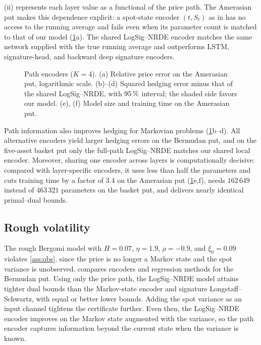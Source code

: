 (ii) represents each layer value as a functional of the price path. The Amerasian put makes this dependence explicit: a spot-state encoder $(t,S_t)$ as in \cite{huang2026} has no access to the running average and fails even when its parameter count is matched to that of our model (\cref{fig:encoders}a). The shared LogSig--NRDE encoder matches the same network supplied with the true running average and outperforms LSTM, signature-head, and backward deep signature \cite{bayraktar2024} encoders.

\begin{figure}[htbp]
\centering
\resizebox{\textwidth}{!}{}
\caption{Path encoders ($K=4$). (a) Relative price error on the Amerasian put, logarithmic scale. (b)--(d) Squared hedging error minus that of the shared LogSig--NRDE, with $95\,\%$ interval; the shaded side favors our model. (e), (f) Model size and training time on the Amerasian put.}
\label{fig:encoders}
\end{figure}

Path information also improves hedging for Markovian problems (\cref{fig:encoders}b--d). All alternative encoders yield larger hedging errors on the Bermudan put, and on the five-asset basket put only the full-path LogSig--NRDE matches our shared local encoder. Moreover, sharing one encoder across layers is computationally decisive: compared with layer-specific encoders, it uses less than half the parameters and cuts training time by a factor of $3.4$ on the Amerasian put (\cref{fig:encoders}e,f), needs $162\,649$ instead of $463\,321$ parameters on the basket put, and delivers nearly identical primal--dual bounds.


\subsection{Rough volatility}\label{sec:exp-rough}

The rough Bergomi model \cite{bayer2016} with $H=0.07$, $\eta=1.9$, $\rho=-0.9$, and $\xi_0=0.09$ violates \cref{ass:obs}, since the price is no longer a Markov state and the spot variance is unobserved.  compares encoders and regression methods for the Bermudan put. Using only the price path, the LogSig--NRDE model attains tighter dual bounds than the Markov-state encoder and signature Longstaff--Schwartz, with equal or better lower bounds. Adding the spot variance as an input channel tightens the certificate further. Even then, the LogSig--NRDE encoder improves on the Markov state augmented with the variance, so the path encoder captures information beyond the current state when the variance is known.

